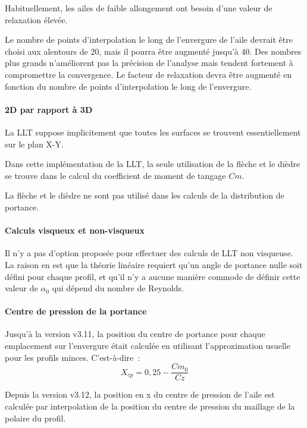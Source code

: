 \documentclass[a4paper,twoside,12pt,dvips]{article}
\begin{document}
Habituellement, les ailes de faible allongement ont besoin d’une valeur de 
relaxation élevée. 

Le nombre de points d’interpolation le long de l’envergure de l’aile devrait être choisi aux alentours de 20, mais il pourra être augmenté jusqu’à 40. Des nombres plus grands n’améliorent pas la précision de l’analyse mais tendent 
fortement à compromettre la convergence. Le facteur de relaxation devra
être augmenté en fonction du nombre de points d’interpolation le long de l’envergure.

\paragraph{2D par rapport à 3D}

La LLT suppose implicitement que toutes les surfaces se trouvent 
essentiellement sur le plan X-Y. 

Dans cette implémentation de la LLT, la seule utilisation de la flèche et le dièdre se trouve dans le calcul du coefficient de moment de tangage $Cm$. 

La flèche et le dièdre ne sont pas utilisé dans les calculs de la 
distribution de portance. 

\paragraph{Calculs visqueux et non-visqueux}

Il n’y a pas d’option proposée pour effectuer des calculs de LLT non visqueuse. La raison en est que la théorie linéaire requiert qu’un angle de portance nulle soit défini pour chaque profil, et qu’il n’y a aucune manière commode de définir cette valeur de $\alpha_0$ qui dépend du nombre de Reynolds. 
    
\paragraph{Centre de pression de la portance}

Jusqu’à la version v3.11, la position du centre de portance pour chaque
emplacement sur l’envergure était calculée en utilisant l’approximation
usuelle pour les profils minces. C’est-à-dire~:
$$ X_{cp} = 0,25 - \frac{Cm_0} {Cz} $$

Depuis la version v3.12, la position en x du centre de pression de l’aile est calculée par interpolation de la position du centre de pression du maillage de la polaire du profil.
\end{document}
